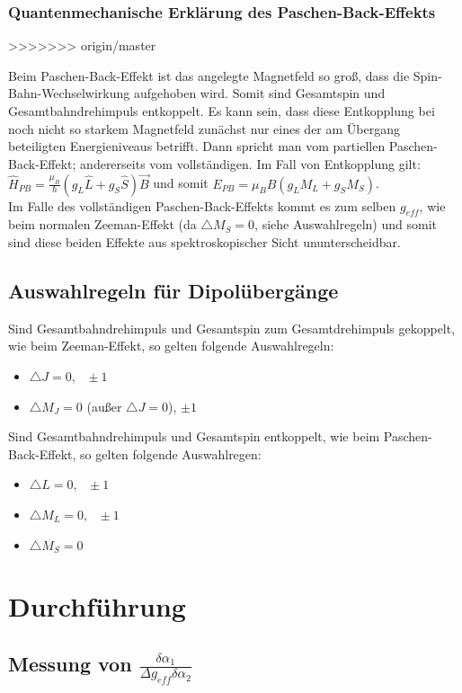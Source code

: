 \documentclass[bigchapter,colorback,accentcolor=tud4b,linedtoc,11pt]{tudreport}
\begin{document}
\subsection{Quantenmechanische Erklärung des Paschen-Back-Effekts}
>>>>>>> origin/master

Beim Paschen-Back-Effekt ist das angelegte Magnetfeld so groß, dass
die Spin-Bahn-Wechselwirkung aufgehoben wird. Somit sind Gesamtspin
und Gesamtbahndrehimpuls entkoppelt. Es kann sein, dass diese Entkopplung
bei noch nicht so starkem Magnetfeld zunächst nur eines der am Übergang
beteiligten Energieniveaus betrifft. Dann spricht man vom partiellen
Paschen-Back-Effekt; andererseits vom vollständigen. Im Fall von Entkopplung
gilt: $\hat{H}_{PB}=\frac{\mu_{B}}{\hslash}(g_{L}\hat{L}+g_{S}\hat{S})\vec{B}$
und somit $E_{PB}=\mu_{B}B(g_{L}M_{L}+g_{S}M_{S})$.\\
Im Falle des vollständigen Paschen-Back-Effekts kommt es zum selben
$g_{eff}$, wie beim normalen Zeeman-Effekt (da $\triangle M_{S}=0$,
siehe Auswahlregeln) und somit sind diese beiden Effekte aus spektroskopischer
Sicht ununterscheidbar. 


\section{Auswahlregeln für Dipolübergänge}

Sind Gesamtbahndrehimpuls und Gesamtspin zum Gesamtdrehimpuls gekoppelt,
wie beim Zeeman-Effekt, so gelten folgende Auswahlregeln:
\begin{itemize}
\item $\triangle J=0,\mbox{ }\pm1$
\item $\triangle M_{J}=0$ (außer $\triangle J=\text{0}$), $\pm1$
\end{itemize}
Sind Gesamtbahndrehimpuls und Gesamtspin entkoppelt, wie beim Paschen-Back-Effekt,
so gelten folgende Auswahlregen:
\begin{itemize}
\item $\triangle L=0,\mbox{ }\pm1$
\item $\triangle M_{L}=0,\mbox{ }\pm1$
\item $\triangle M_{S}=0$\end{itemize}

\chapter{Durchführung}
\section{Messung von $\frac{\delta\alpha_1}{\Delta g_{eff} \delta\alpha_2}$}
\end{document}
